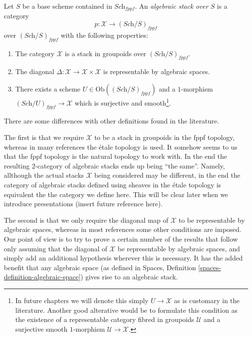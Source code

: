 \begin{definition}
\label{definition-algebraic-stack}
Let $S$ be a base scheme contained in $\textit{Sch}_{fppf}$.
An {\it algebraic stack over $S$} is a category
$$
p : \mathcal{X} \to (\textit{Sch}/S)_{fppf}
$$
over $(\textit{Sch}/S)_{fppf}$ with the following properties:
\begin{enumerate}
\item The category $\mathcal{X}$ is a stack in groupoids over
$(\textit{Sch}/S)_{fppf}$.
\item The diagonal
$\Delta : \mathcal{X} \to \mathcal{X}\times\mathcal{X}$
is representable by algebraic spaces.
\item There exists a scheme $U \in \text{Ob}((\textit{Sch}/S)_{fppf})$
and a $1$-morphism $(\textit{Sch}/U)_{fppf} \to \mathcal{X}$
which is surjective and smooth\footnote{In future chapters we will denote
this simply $U \to \mathcal{X}$ as is customary in the literature. Another
good alterative would be to formulate this condition as the existence of a
representable category fibred in groupoids $\mathcal{U}$ and a surjective
smooth $1$-morphism $\mathcal{U} \to \mathcal{X}$.}.
\end{enumerate}
\end{definition}

\noindent
There are some differences with other definitions found in the literature.

\medskip\noindent
The first is that we require $\mathcal{X}$ to be a stack in groupoids
in the fppf topology, whereas in many references the \'etale topology is
used. It somehow seems to us that the fppf topology is the natural topology
to work with. In the end the resulting $2$-category of algebraic stacks
ends up being ``the same''. Namely, allthough the actual
stacks $\mathcal{X}$ being considered may be different, in the end the
category of algebraic stacks defined using sheaves in the \'etale topology
is equivalent the the category we define here. This will be clear later
when we introduce presentations (insert future reference here).

\medskip\noindent
The second is that we only require the diagonal map of $\mathcal{X}$ to be
representable by algebraic spaces, whereas in most references some other
conditions are imposed. Our point of view is to try to prove a certain
number of the results that follow only assuming that the diagonal
of $\mathcal{X}$ be representable by algebraic spaces, and simply add
an additional hypothesis wherever this is necessary. It has the added
benefit that any algebraic space (as defined in
Spaces, Definition \ref{spaces-definition-algebraic-space})
gives rise to an algebraic stack.

